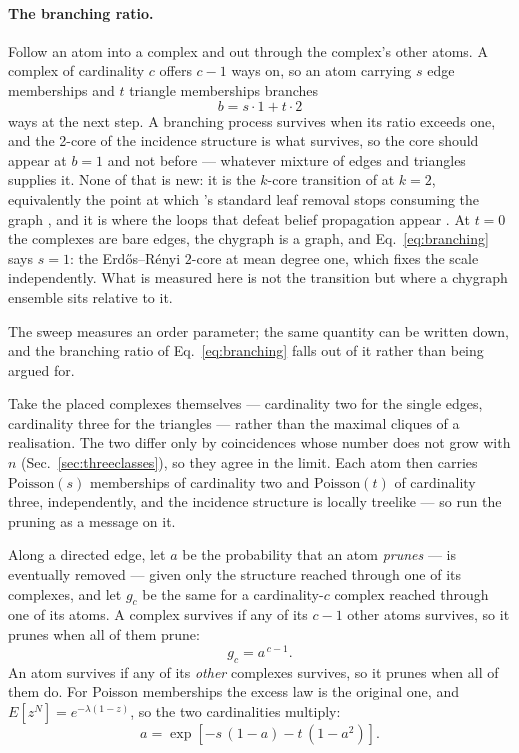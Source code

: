 \paragraph{The branching ratio.} Follow an atom into a complex and out through
the complex's other atoms. A complex of cardinality $c$ offers $c-1$ ways on, so
an atom carrying $s$ edge memberships and $t$ triangle memberships branches
\begin{equation}
  b=s\cdot 1+t\cdot 2
  \label{eq:branching}
\end{equation}
ways at the next step. A branching process survives when its ratio exceeds one,
and the 2-core of the incidence structure is what survives, so the core should
appear at $b=1$ and not before --- whatever mixture of edges and triangles
supplies it. None of that is new: it is the $k$-core transition of
\citet{pittel1996} at $k=2$, equivalently the point at which
\citeauthor{bauer2001}'s standard leaf removal stops consuming the graph
\citep{bauer2001}, and it is where the loops that defeat belief propagation
appear \citep{mezard2009}. At $t=0$ the
complexes are bare edges, the chygraph is a graph, and
Eq.~\eqref{eq:branching} says $s=1$: the Erd\H{o}s--R\'enyi $2$-core at mean
degree one, which fixes the scale independently. What is measured here is not
the transition but where a chygraph ensemble sits relative to it.

The sweep measures an order parameter; the same quantity can be written down,
and the branching ratio of Eq.~\eqref{eq:branching} falls out of it rather than
being argued for.

Take the placed complexes themselves --- cardinality two for the single edges,
cardinality three for the triangles --- rather than the maximal cliques of a
realisation. The two differ only by coincidences whose number does not grow with
$n$ (Sec.~\ref{sec:threeclasses}), so they agree in the limit. Each atom then
carries $\mathrm{Poisson}(s)$ memberships of cardinality two and
$\mathrm{Poisson}(t)$ of cardinality three, independently, and the incidence
structure is locally treelike --- so run the pruning as a message on it.

Along a directed edge, let $a$ be the probability that an atom \emph{prunes}
--- is eventually removed --- given only the structure reached through one of
its complexes, and let $g_{c}$ be the same for a cardinality-$c$ complex
reached through one of its atoms. A complex survives if any of its $c-1$ other
atoms survives, so it prunes when all of them prune:
\[
  g_{c}=a^{\,c-1}.
\]
An atom survives if any of its \emph{other} complexes survives, so it prunes
when all of them do. For Poisson memberships the excess law is the original one,
and $E[z^{N}]=e^{-\lambda(1-z)}$, so the two cardinalities multiply:
\begin{equation}
  a=\exp\!\left[-s\,(1-a)-t\,(1-a^{2})\right].
  \label{eq:corea}
\end{equation}

